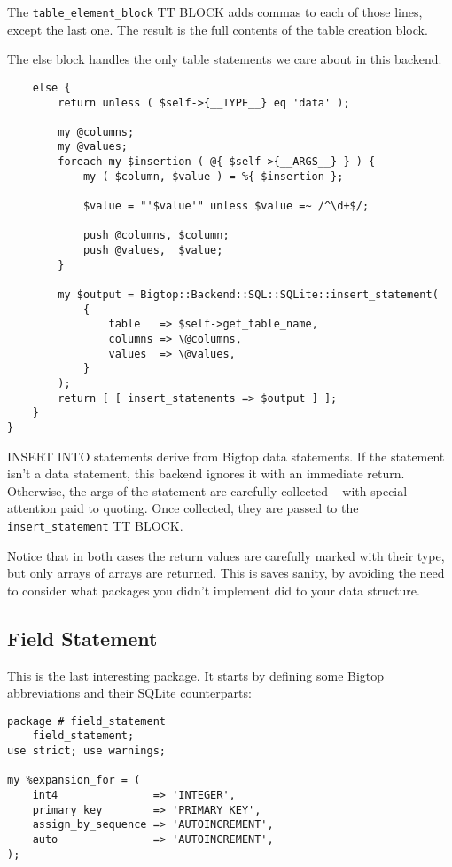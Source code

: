 The \verb+table_element_block+ TT BLOCK adds commas to each of those
lines, except the last one.  The result is the full contents of the table
creation block.

The else block handles the only table statements we care about in this
backend.

\begin{verbatim}
    else {
        return unless ( $self->{__TYPE__} eq 'data' );

        my @columns;
        my @values;
        foreach my $insertion ( @{ $self->{__ARGS__} } ) {
            my ( $column, $value ) = %{ $insertion };

            $value = "'$value'" unless $value =~ /^\d+$/;

            push @columns, $column;
            push @values,  $value;
        }

        my $output = Bigtop::Backend::SQL::SQLite::insert_statement(
            {
                table   => $self->get_table_name,
                columns => \@columns,
                values  => \@values,
            }
        );
        return [ [ insert_statements => $output ] ];
    }
}
\end{verbatim}

INSERT INTO statements derive from Bigtop data statements.  If the statement
isn't a data statement, this backend ignores it with an immediate return.
Otherwise, the args of the statement are carefully collected -- with special
attention paid to quoting.  Once collected, they are passed to the
\verb+insert_statement+ TT BLOCK.

Notice that in both cases the return values are carefully marked with their
type, but only arrays of arrays are returned.  This is saves sanity, by
avoiding the need to consider what packages you didn't implement did to
your data structure.

\subsection*{Field Statement}

This is the last interesting package.  It starts by defining some Bigtop
abbreviations and their SQLite counterparts:

\begin{verbatim}
package # field_statement
    field_statement;
use strict; use warnings;

my %expansion_for = (
    int4               => 'INTEGER',
    primary_key        => 'PRIMARY KEY',
    assign_by_sequence => 'AUTOINCREMENT',
    auto               => 'AUTOINCREMENT',
);
\end{verbatim}

